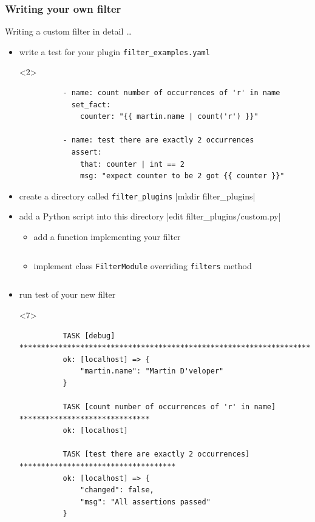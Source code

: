 \documentclass[pdf]{beamer}
\begin{document}
\begin{frame}[t,fragile]
  \frametitle{Writing your own filter}
  Writing a custom filter in detail \ldots
  \pause{}
  \begin{itemize}
    \item<+-> write a test for your plugin \texttt{filter\_examples.yaml}
      \begin{onlyenv}<2>
        \begin{verbatim}
          - name: count number of occurrences of 'r' in name
            set_fact:
              counter: "{{ martin.name | count('r') }}"

          - name: test there are exactly 2 occurrences
            assert:
              that: counter | int == 2
              msg: "expect counter to be 2 got {{ counter }}"
        \end{verbatim}
      \end{onlyenv}
    \item<+-> create a directory called \texttt{filter\_plugins}
       {|mkdir filter_plugins|}
    \item<+-> add a Python script into this directory
       {|edit filter_plugins/custom.py|}
      \begin{itemize}
        \item<+-> add a function implementing your filter
           {\inputminted[firstline=3,lastline=5]{python}{filter_plugins/custom.py}}
        \item<+-> implement class \texttt{FilterModule} overriding \texttt{filters} method
           {\inputminted[firstline=7,lastline=10]{python}{filter_plugins/custom.py}}
      \end{itemize}
    \item<+-> run test of your new filter
      \begin{onlyenv}<7>
        \begin{verbatim}
          TASK [debug] *******************************************************************
          ok: [localhost] => {
              "martin.name": "Martin D'veloper"
          }

          TASK [count number of occurrences of 'r' in name] ******************************
          ok: [localhost]

          TASK [test there are exactly 2 occurrences] ************************************
          ok: [localhost] => {
              "changed": false,
              "msg": "All assertions passed"
          }
        \end{verbatim}
      \end{onlyenv}
  \end{itemize}
\end{frame}
\end{document}
